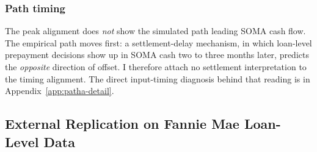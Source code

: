 \documentclass[12pt]{article}
\begin{document}
\subsubsection{Path timing}

The peak alignment does \emph{not} show the simulated path leading SOMA cash flow. The empirical path moves first: a settlement-delay mechanism, in which loan-level prepayment decisions show up in SOMA cash two to three months later, predicts the \emph{opposite} direction of offset. I therefore attach no settlement interpretation to the timing alignment. The direct input-timing diagnosis behind that reading is in Appendix~\ref{app:patha-detail}.

\subsection{External Replication on Fannie Mae Loan-Level Data}\label{sec:pathb-fannie}
\end{document}

